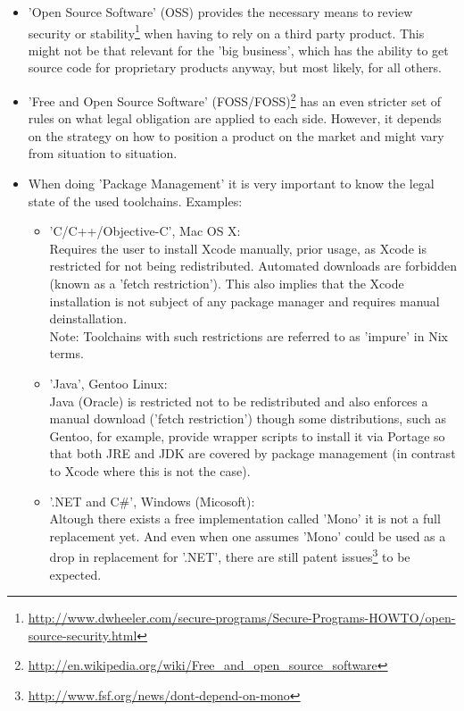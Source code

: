 \documentclass[a4paper,10pt]{article}
\begin{document}
\begin{itemize}
 \item 'Open Source Software' (OSS) provides the necessary means to review security or stability\footnote{\url{http://www.dwheeler.com/secure-programs/Secure-Programs-HOWTO/open-source-security.html}} when having to rely on a third party product. This might not be that relevant for the 'big business', which has the ability to get source code for proprietary products anyway, but most likely, for all others.

 \item 'Free and Open Source Software' (FOSS/FOSS)\footnote{\url{http://en.wikipedia.org/wiki/Free_and_open_source_software}} has an even stricter set of rules on what legal obligation are applied to each side. However, it depends on the strategy on how to position a product on the market and might vary from situation to situation. 

 \item When doing 'Package Management' it is very important to know the legal state of the used toolchains. Examples:
\begin{itemize}
 \item 'C/C++/Objective-C', Mac OS X: \\Requires the user to install Xcode manually, prior usage, as Xcode is restricted for not being redistributed. Automated downloads are forbidden (known as a 'fetch restriction'). This also implies that the Xcode installation is not subject of any package manager and requires manual deinstallation. \\Note: Toolchains with such restrictions are referred to as 'impure' in Nix terms.
 \item 'Java', Gentoo Linux: \\Java (Oracle) is restricted not to be redistributed and also enforces a manual download ('fetch restriction') though some distributions, such as Gentoo, for example, provide wrapper scripts to install it via Portage so that both JRE and JDK are covered by package management (in contrast to Xcode where this is not the case).
 \item '.NET and C\#', Windows (Micosoft):\\ Altough there exists a free implementation called 'Mono' it is not a full replacement yet. And even when one assumes 'Mono' could be used as a drop in replacement for '.NET', there are still patent issues\footnote{\url{http://www.fsf.org/news/dont-depend-on-mono}} to be expected.
\end{itemize}

\end{itemize}
\end{document}
